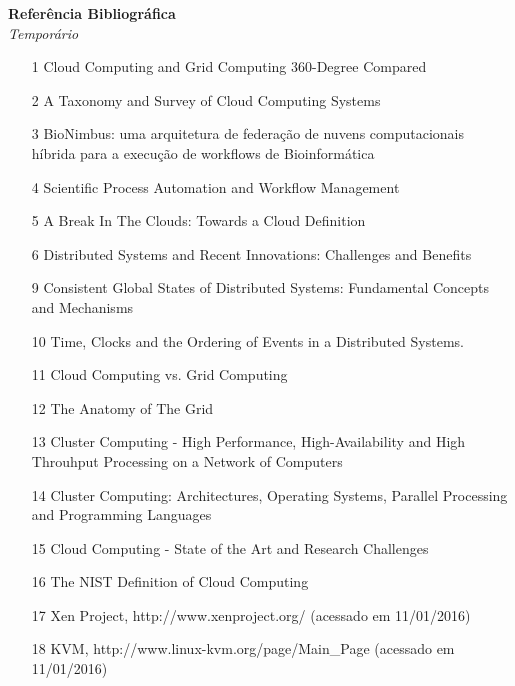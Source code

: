 \documentclass[engenharia]{UnB-CIC}%
\begin{document}
%
    
\newpage

\begin{center}
   	\textbf{\large{Referência Bibliográfica}} \\
    \textit{Temporário}
\end{center}  

\begin{itemize}
    \item [1] Cloud Computing and Grid Computing 360-Degree Compared
	\item [2] A Taxonomy and Survey of Cloud Computing Systems
	\item [3] BioNimbus: uma arquitetura de federação de nuvens computacionais híbrida para a execução de workflows de Bioinformática
	\item [4] Scientific Process Automation and Workflow Management
	\item [5] A Break In The Clouds: Towards a Cloud Definition
	\item [6] Distributed Systems and Recent Innovations: Challenges and Benefits
	\item [9] Consistent Global States of Distributed Systems: Fundamental Concepts and Mechanisms
	\item [10] Time, Clocks and the Ordering of Events in a Distributed Systems.
	\item [11] Cloud Computing vs. Grid Computing 
	\item [12] The Anatomy of The Grid
	\item [13] Cluster Computing - High Performance, High-Availability and High Throuhput Processing on a Network of Computers
	\item [14] Cluster Computing: Architectures, Operating Systems, Parallel Processing and Programming Languages
	\item [15] Cloud Computing - State of the Art and Research Challenges
	\item [16] The NIST Definition of Cloud Computing
    \item [17] Xen Project, http://www.xenproject.org/ (acessado em 11/01/2016)
    \item [18] KVM, http://www.linux-kvm.org/page/Main\_Page (acessado em 11/01/2016)

\end{itemize}
\end{document}
